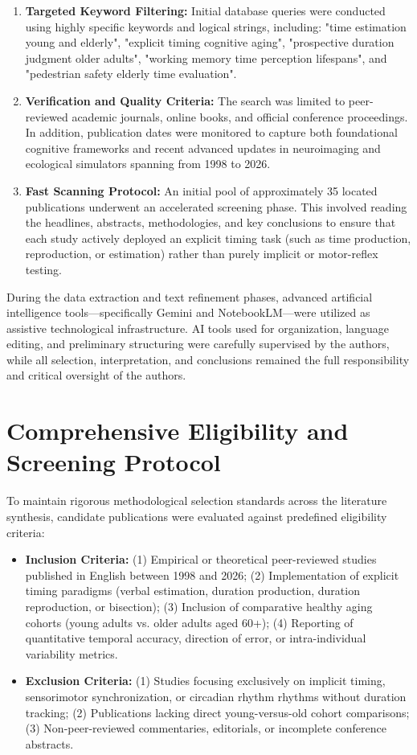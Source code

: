 \documentclass{custom_report}
\begin{document}
\begin{enumerate}
    \item \textbf{Targeted Keyword Filtering:} Initial database queries were conducted using highly specific keywords and logical strings, including: "time estimation young and elderly", "explicit timing cognitive aging", "prospective duration judgment older adults", "working memory time perception lifespans", and "pedestrian safety elderly time evaluation".
    \item \textbf{Verification and Quality Criteria:} The search was limited to peer-reviewed academic journals, online books, and official conference proceedings. In addition, publication dates were monitored to capture both foundational cognitive frameworks and recent advanced updates in neuroimaging and ecological simulators spanning from 1998 to 2026.
    \item \textbf{Fast Scanning Protocol:} An initial pool of approximately 35 located publications underwent an accelerated screening phase. This involved reading the headlines, abstracts, methodologies, and key conclusions to ensure that each study actively deployed an explicit timing task (such as time production, reproduction, or estimation) rather than purely implicit or motor-reflex testing.
\end{enumerate}

During the data extraction and text refinement phases, advanced artificial intelligence tools—specifically Gemini and NotebookLM—were utilized as assistive technological infrastructure. AI tools used for organization, language editing, and preliminary structuring were carefully supervised by the authors, while all selection, interpretation, and conclusions remained the full responsibility and critical oversight of the authors.

\section{Comprehensive Eligibility and Screening Protocol}
To maintain rigorous methodological selection standards across the literature synthesis, candidate publications were evaluated against predefined eligibility criteria:

\begin{itemize}
    \item \textbf{Inclusion Criteria:} (1) Empirical or theoretical peer-reviewed studies published in English between 1998 and 2026; (2) Implementation of explicit timing paradigms (verbal estimation, duration production, duration reproduction, or bisection); (3) Inclusion of comparative healthy aging cohorts (young adults vs. older adults aged 60+); (4) Reporting of quantitative temporal accuracy, direction of error, or intra-individual variability metrics.
    \item \textbf{Exclusion Criteria:} (1) Studies focusing exclusively on implicit timing, sensorimotor synchronization, or circadian rhythm rhythms without duration tracking; (2) Publications lacking direct young-versus-old cohort comparisons; (3) Non-peer-reviewed commentaries, editorials, or incomplete conference abstracts.
\end{itemize}
\end{document}
